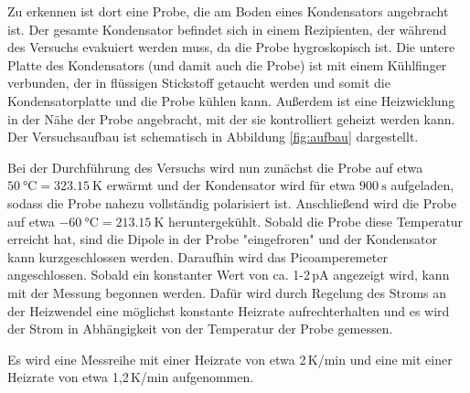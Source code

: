 Zu erkennen ist dort eine Probe, die am Boden eines Kondensators angebracht ist.
Der gesamte Kondensator befindet sich in einem Rezipienten, der während des
Versuchs evakuiert werden muss, da die Probe hygroskopisch ist. Die untere Platte
des Kondensators (und damit auch die Probe) ist mit einem Kühlfinger verbunden,
der in flüssigen Stickstoff getaucht werden und somit die Kondensatorplatte
und die Probe kühlen kann. Außerdem ist eine Heizwicklung in der Nähe der
Probe angebracht, mit der sie kontrolliert geheizt werden kann.
Der Versuchsaufbau ist schematisch in Abbildung \ref{fig:aufbau} dargestellt.

Bei der Durchführung des Versuchs wird nun zunächst die Probe auf etwa $\SI{50}{\celsius}=\SI{323.15}{\kelvin}$ erwärmt
und der Kondensator wird für etwa $\SI{900}{\second}$ aufgeladen, sodass die Probe nahezu vollständig
polarisiert ist. Anschließend wird die Probe auf etwa $\SI{-60}{\celsius}=\SI{213.15}{\kelvin}$ heruntergekühlt.
Sobald die Probe diese Temperatur erreicht hat, sind die Dipole in der Probe
"eingefroren" und der Kondensator kann kurzgeschlossen werden. Daraufhin wird das
Picoamperemeter angeschlossen. Sobald ein konstanter Wert von ca. 1-2\,pA angezeigt
wird, kann mit der Messung begonnen werden. Dafür wird durch Regelung des Stroms
an der Heizwendel eine möglichst konstante Heizrate aufrechterhalten und es wird
der Strom in Abhängigkeit von der Temperatur der Probe gemessen.

Es wird eine Messreihe mit einer Heizrate von etwa 2\,K/min und eine mit einer Heizrate
von etwa 1{,}2\,K/min aufgenommen.

